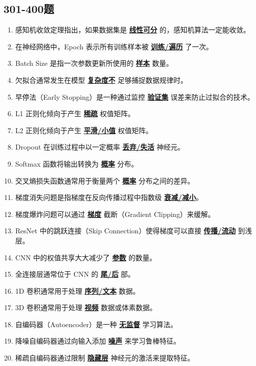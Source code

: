 \documentclass[12pt,a4paper,openany]{ctexbook}
\begin{document}
\subsection{301-400题}
\begin{enumerate}[resume,leftmargin=2em,itemsep=1pt]
\item 感知机收敛定理指出，如果数据集是 \underline{\textbf{线性可分}} 的，感知机算法一定能收敛。
\item 在神经网络中，Epoch 表示所有训练样本被 \underline{\textbf{训练/遍历}} 了一次。
\item Batch Size 是指一次参数更新所使用的 \underline{\textbf{样本}} 数量。
\item 欠拟合通常发生在模型 \underline{\textbf{复杂度不}} 足够捕捉数据规律时。
\item 早停法（Early Stopping）是一种通过监控 \underline{\textbf{验证集}} 误差来防止过拟合的技术。
\item L1 正则化倾向于产生 \underline{\textbf{稀疏}} 权值矩阵。
\item L2 正则化倾向于产生 \underline{\textbf{平滑/小值}} 权值矩阵。
\item Dropout 在训练过程中以一定概率 \underline{\textbf{丢弃/失活}} 神经元。
\item Softmax 函数将输出转换为 \underline{\textbf{概率}} 分布。
\item 交叉熵损失函数通常用于衡量两个 \underline{\textbf{概率}} 分布之间的差异。
\item 梯度消失问题是指梯度在反向传播过程中指数级 \underline{\textbf{衰减/减小}}。
\item 梯度爆炸问题可以通过 \underline{\textbf{梯度}} 截断（Gradient Clipping）来缓解。
\item ResNet 中的跳跃连接（Skip Connection）使得梯度可以直接 \underline{\textbf{传播/流动}} 到浅层。
\item CNN 中的权值共享大大减少了 \underline{\textbf{参数}} 的数量。
\item 全连接层通常位于 CNN 的 \underline{\textbf{尾/后}} 部。
\item 1D 卷积通常用于处理 \underline{\textbf{序列/文本}} 数据。
\item 3D 卷积通常用于处理 \underline{\textbf{视频}} 数据或体素数据。
\item 自编码器（Autoencoder）是一种 \underline{\textbf{无监督}} 学习算法。
\item 降噪自编码器通过向输入添加 \underline{\textbf{噪声}} 来学习鲁棒特征。
\item 稀疏自编码器通过限制 \underline{\textbf{隐藏层}} 神经元的激活来提取特征。

\end{enumerate}
\end{document}
